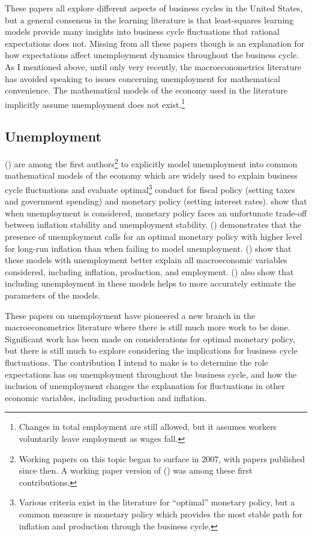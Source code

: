 \documentclass[11pt]{article}
\newcommand{\citee}[1]{\citename{#1} (\citeyear{#1})}
\begin{document}
These papers all explore different aspects of business cycles in the United States, but a general consensus in the learning literature is that least-squares learning models provide many insights into business cycle fluctuations that rational expectations does not.  Missing from all these papers though is an explanation for how expectations affect unemployment dynamics throughout the business cycle.  As I mentioned above, until only very recently, the macroeconometrics literature has avoided speaking to issues concerning unemployment for mathematical convenience.  The mathematical models of the economy used in the literature implicitly assume unemployment does not exist.\footnote{Changes in total employment are still allowed, but it assumes workers voluntarily leave employment as wages fall.}

\subsection{Unemployment}
\citee{blanchard_gali2010} are among the first authors\footnote{Working papers on this topic began to surface in 2007, with papers published since then.  A working paper version of \citee{blanchard_gali2010} was among these first contributions.} to explicitly model unemployment into common mathematical models of the economy which are widely used to explain business cycle fluctuations and evaluate optimal\footnote{Various criteria exist in the literature for ``optimal'' monetary policy, but a common measure is monetary policy which provides the most stable path for inflation and production through the business cycle.} conduct for fiscal policy (setting taxes and government spending) and monetary policy (setting interest rates).   show that when unemployment is considered, monetary policy faces an unfortunate trade-off between inflation stability and unemployment stability.  \citee{thomas2008} demonstrates that the presence of unemployment calls for an optimal monetary policy with higher level for long-run inflation than when failing to model unemployment.
  \citee{gst2008} show that these models with unemployment better explain all macroeconomic variables considered, including inflation, production, and employment.  \citee{gsw2010} also show that including unemployment in these models helps to more accurately estimate the parameters of the models.

These papers on unemployment have pioneered a new branch in the macroeconometrics literature where there is still much more work to be done.  Significant work has been made on considerations for optimal monetary policy, but there is still much to explore considering the implications for business cycle fluctuations.  The contribution I intend to make is to determine the role expectations has on unemployment throughout the business cycle, and how the inclusion of unemployment changes the explanation for fluctuations in other economic variables, including production and inflation.  
\end{document}
